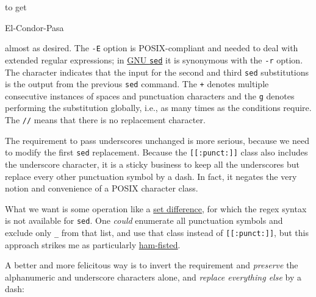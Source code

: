 \documentclass[
  a4paper,
]{article}
\newenvironment{Shaded}{\begin{snugshade}}{\end{snugshade}}
\newcommand{\AttributeTok}[1]{\textcolor[rgb]{0.80,0.80,0.80}{#1}}
\newcommand{\DataTypeTok}[1]{\textcolor[rgb]{0.87,0.87,0.75}{#1}}
\newcommand{\ExtensionTok}[1]{\textcolor[rgb]{0.80,0.80,0.80}{#1}}
\newcommand{\FunctionTok}[1]{\textcolor[rgb]{0.94,0.94,0.56}{#1}}
\newcommand{\KeywordTok}[1]{\textcolor[rgb]{0.94,0.87,0.69}{#1}}
\newcommand{\OperatorTok}[1]{\textcolor[rgb]{0.94,0.94,0.82}{#1}}
\newcommand{\StringTok}[1]{\textcolor[rgb]{0.80,0.58,0.58}{#1}}
\begin{document}
to get

\begin{Shaded}
\begin{Highlighting}[]
\ExtensionTok{El{-}Condor{-}Pasa}
\end{Highlighting}
\end{Shaded}

almost as desired. The \texttt{-E} option is POSIX-compliant and needed
to deal with extended regular expressions; in
\href{https://www.gnu.org/software/sed/manual/html_node/Command_002dLine-Options.html}{GNU
\texttt{sed}} it is synonymous with the \texttt{-r} option. The
\texttt{\textbar{}} character indicates that the input for the second
and third \texttt{sed} substitutions is the output from the previous
\texttt{sed} command. The \texttt{+} denotes multiple consecutive
instances of spaces and punctuation characters and the \texttt{g}
denotes performing the substitution globally, i.e., as many times as the
conditions require. The \texttt{//} means that there is no replacement
character.

The requirement to pass underscores unchanged is more serious, because
we need to modify the first \texttt{sed} replacement. Because the
\texttt{{[}{[}:punct:{]}{]}} class also includes the underscore
character, it is a sticky business to keep all the underscores but
replace every other punctuation symbol by a dash. In fact, it negates
the very notion and convenience of a POSIX character class.

What we want is some operation like a
\href{https://mathworld.wolfram.com/SetDifference.html}{set difference},
for which the regex syntax is not available for \texttt{sed}. One
\emph{could} enumerate all punctuation symbols and exclude only
\texttt{\_} from that list, and use that class instead of
\texttt{{[}{[}:punct:{]}{]}}, but this approach strikes me as
particularly
\href{https://idioms.thefreedictionary.com/Ham+Fisted}{ham-fisted}.

A better and more felicitous way is to invert the requirement and
\emph{preserve} the alphanumeric and underscore characters alone, and
\emph{replace everything else} by a dash:

\begin{Shaded}
\end{Shaded}
\end{document}
